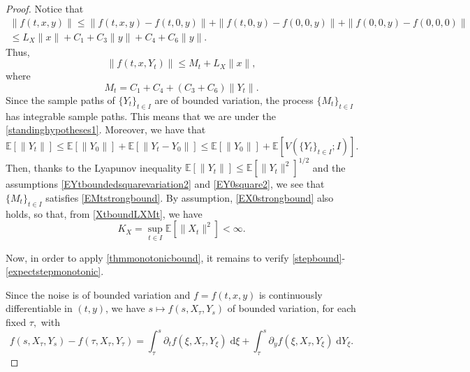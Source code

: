 \documentclass[reqno,12pt]{amsart}
\theoremstyle{plain} %
\theoremstyle{definition} %
\begin{document}
\begin{proof}
    Notice that
    \begin{multline*}
        \|f(t, x, y)\| \leq \|f(t, x, y) - f(t, 0, y)\| + \|f(t, 0, y) - f(0, 0, y)\| + \|f(0, 0, y) - f(0, 0, 0)\| \\
        \leq L_X \|x\| + C_1 + C_3\|y\| + C_4 + C_6\|y\|. 
    \end{multline*}
    Thus,
    \[
        \|f(t, x, Y_t)\| \leq M_t + L_X \|x\|,
    \]
    where
    \[
        M_t = C_1 + C_4 + (C_3 + C_6)\|Y_t\|.
    \]
    Since the sample paths of $\{Y_t\}_{t\in I}$ are of bounded variation, the process $\{M_t\}_{t\in I}$ has integrable sample paths. This means that we are under the \cref{standinghypotheses1}. Moreover, we have that
    \[
        \mathbb{E}[\|Y_t\|] \leq \mathbb{E}[\|Y_0\|] + \mathbb{E}[\|Y_t - Y_0\|] \leq \mathbb{E}[\|Y_0\|] + \mathbb{E}[V(\{Y_t\}_{t\in I}; I)].
    \]
    Then, thanks to the Lyapunov inequality $\mathbb{E}[\|Y_t\|] \leq \mathbb{E}[\|Y_t\|^2]^{1/2}$ and the assumptions \eqref{EYtboundedsquarevariation2} and \eqref{EY0square2}, we see that $\{M_t\}_{t\in I}$ satisfies \eqref{EMtstrongbound}. By assumption, \eqref{EX0strongbound} also holds, so that, from \eqref{XtboundLXMt}, we have
    \[
        K_X = \sup_{t\in I}\mathbb{E}[\|X_t\|^2] < \infty.
    \]

    Now, in order to apply \cref{thmmonotonicbound}, it remains to verify \eqref{stepbound}-\eqref{expectstepmonotonic}.

    Since the noise is of bounded variation and $f=f(t, x, y)$ is continuously differentiable in $(t, y)$, we have $s\mapsto f(s, X_\tau, Y_s)$ of bounded variation, for each fixed $\tau,$ with
    \[
        f(s, X_\tau, Y_s) - f(\tau, X_\tau, Y_\tau) = \int_\tau^s \partial_t f(\xi, X_\tau, Y_\xi) \;\mathrm{d}\xi + \int_\tau^s \partial_y f(\xi, X_\tau, Y_\xi) \;\mathrm{d} Y_\xi.
    \]


\end{proof}
\end{document}
